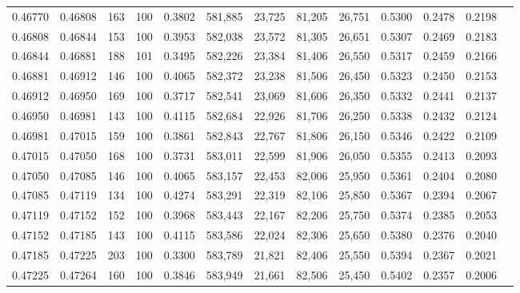 \begin{tabular}{rrrrrrrrrrrrr}
0.46770 & 0.46808 &    163 & 100 &                                     0.3802 & 581,885 &  23,725 &  81,205 &  26,751 & 0.5300 & 0.2478 & 0.2198 \\
0.46808 & 0.46844 &    153 & 100 &                                     0.3953 & 582,038 &  23,572 &  81,305 &  26,651 & 0.5307 & 0.2469 & 0.2183 \\
0.46844 & 0.46881 &    188 & 101 &                                     0.3495 & 582,226 &  23,384 &  81,406 &  26,550 & 0.5317 & 0.2459 & 0.2166 \\
0.46881 & 0.46912 &    146 & 100 &                                     0.4065 & 582,372 &  23,238 &  81,506 &  26,450 & 0.5323 & 0.2450 & 0.2153 \\
0.46912 & 0.46950 &    169 & 100 &                                     0.3717 & 582,541 &  23,069 &  81,606 &  26,350 & 0.5332 & 0.2441 & 0.2137 \\
0.46950 & 0.46981 &    143 & 100 &                                     0.4115 & 582,684 &  22,926 &  81,706 &  26,250 & 0.5338 & 0.2432 & 0.2124 \\
0.46981 & 0.47015 &    159 & 100 &                                     0.3861 & 582,843 &  22,767 &  81,806 &  26,150 & 0.5346 & 0.2422 & 0.2109 \\
0.47015 & 0.47050 &    168 & 100 &                                     0.3731 & 583,011 &  22,599 &  81,906 &  26,050 & 0.5355 & 0.2413 & 0.2093 \\
0.47050 & 0.47085 &    146 & 100 &                                     0.4065 & 583,157 &  22,453 &  82,006 &  25,950 & 0.5361 & 0.2404 & 0.2080 \\
0.47085 & 0.47119 &    134 & 100 &                                     0.4274 & 583,291 &  22,319 &  82,106 &  25,850 & 0.5367 & 0.2394 & 0.2067 \\
0.47119 & 0.47152 &    152 & 100 &                                     0.3968 & 583,443 &  22,167 &  82,206 &  25,750 & 0.5374 & 0.2385 & 0.2053 \\
0.47152 & 0.47185 &    143 & 100 &                                     0.4115 & 583,586 &  22,024 &  82,306 &  25,650 & 0.5380 & 0.2376 & 0.2040 \\
0.47185 & 0.47225 &    203 & 100 &                                     0.3300 & 583,789 &  21,821 &  82,406 &  25,550 & 0.5394 & 0.2367 & 0.2021 \\
0.47225 & 0.47264 &    160 & 100 &                                     0.3846 & 583,949 &  21,661 &  82,506 &  25,450 & 0.5402 & 0.2357 & 0.2006 \\

\end{tabular}

